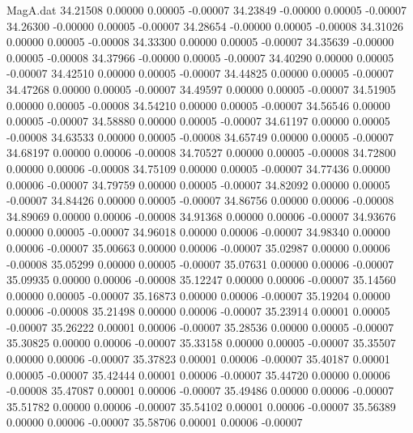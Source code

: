 \begin{filecontents}{MagA.dat}
  34.21508    0.00000    0.00005   -0.00007
  34.23849   -0.00000    0.00005   -0.00007
  34.26300   -0.00000    0.00005   -0.00007
  34.28654   -0.00000    0.00005   -0.00008
  34.31026    0.00000    0.00005   -0.00008
  34.33300    0.00000    0.00005   -0.00007
  34.35639   -0.00000    0.00005   -0.00008
  34.37966   -0.00000    0.00005   -0.00007
  34.40290    0.00000    0.00005   -0.00007
  34.42510    0.00000    0.00005   -0.00007
  34.44825    0.00000    0.00005   -0.00007
  34.47268    0.00000    0.00005   -0.00007
  34.49597    0.00000    0.00005   -0.00007
  34.51905    0.00000    0.00005   -0.00008
  34.54210    0.00000    0.00005   -0.00007
  34.56546    0.00000    0.00005   -0.00007
  34.58880    0.00000    0.00005   -0.00007
  34.61197    0.00000    0.00005   -0.00008
  34.63533    0.00000    0.00005   -0.00008
  34.65749    0.00000    0.00005   -0.00007
  34.68197    0.00000    0.00006   -0.00008
  34.70527    0.00000    0.00005   -0.00008
  34.72800    0.00000    0.00006   -0.00008
  34.75109    0.00000    0.00005   -0.00007
  34.77436    0.00000    0.00006   -0.00007
  34.79759    0.00000    0.00005   -0.00007
  34.82092    0.00000    0.00005   -0.00007
  34.84426    0.00000    0.00005   -0.00007
  34.86756    0.00000    0.00006   -0.00008
  34.89069    0.00000    0.00006   -0.00008
  34.91368    0.00000    0.00006   -0.00007
  34.93676    0.00000    0.00005   -0.00007
  34.96018    0.00000    0.00006   -0.00007
  34.98340    0.00000    0.00006   -0.00007
  35.00663    0.00000    0.00006   -0.00007
  35.02987    0.00000    0.00006   -0.00008
  35.05299    0.00000    0.00005   -0.00007
  35.07631    0.00000    0.00006   -0.00007
  35.09935    0.00000    0.00006   -0.00008
  35.12247    0.00000    0.00006   -0.00007
  35.14560    0.00000    0.00005   -0.00007
  35.16873    0.00000    0.00006   -0.00007
  35.19204    0.00000    0.00006   -0.00008
  35.21498    0.00000    0.00006   -0.00007
  35.23914    0.00001    0.00005   -0.00007
  35.26222    0.00001    0.00006   -0.00007
  35.28536    0.00000    0.00005   -0.00007
  35.30825    0.00000    0.00006   -0.00007
  35.33158    0.00000    0.00005   -0.00007
  35.35507    0.00000    0.00006   -0.00007
  35.37823    0.00001    0.00006   -0.00007
  35.40187    0.00001    0.00005   -0.00007
  35.42444    0.00001    0.00006   -0.00007
  35.44720    0.00000    0.00006   -0.00008
  35.47087    0.00001    0.00006   -0.00007
  35.49486    0.00000    0.00006   -0.00007
  35.51782    0.00000    0.00006   -0.00007
  35.54102    0.00001    0.00006   -0.00007
  35.56389    0.00000    0.00006   -0.00007
  35.58706    0.00001    0.00006   -0.00007

\end{filecontents}
